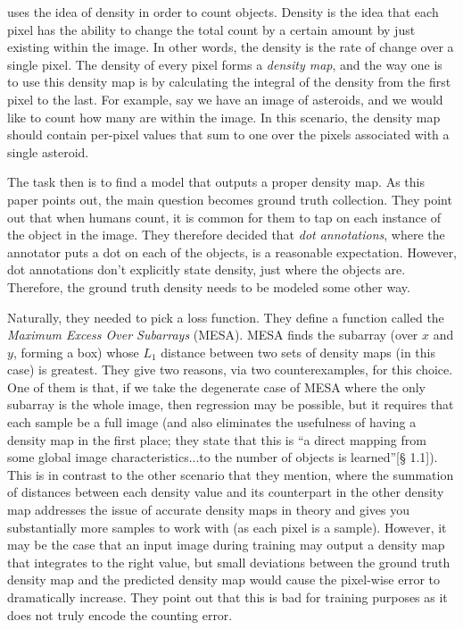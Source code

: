 \cite{learningtocount} uses the idea of density in order to count objects. Density is the idea that
each pixel has the ability to change the total count by a certain amount by just existing within the
image. In other words, the density is the rate of change over a single pixel. The density of every
pixel forms a \textit{density map}, and the way one is to use this density map is by calculating the
integral of the density from the first pixel to the last.
For example, say we have an image of asteroids, and we would like to count how many are within the
image. In this scenario, the density map should contain per-pixel values that sum to one over the
pixels associated with a single asteroid.

The task then is to find a model that outputs a proper density map. As this paper points out, the
main question becomes ground truth collection. They point out that when humans count, it is common
for them to tap on each instance of the object in the image. They therefore decided that \textit{dot
annotations}, where the annotator puts a dot on each of the objects, is a reasonable expectation.
However, dot annotations don't explicitly state density, just where the objects are. Therefore, the
ground truth density needs to be modeled some other way.

Naturally, they needed to pick a loss function. They define a function called the \textit{Maximum
Excess Over Subarrays} (MESA). MESA finds the subarray (over $x$ and $y$, forming a box) whose $L_1$
distance between two sets of density maps (in this case) is greatest. They give two reasons, via two
counterexamples, for this choice. One of them is that, if we take the degenerate case of MESA where
the only subarray is the whole image, then regression may be possible, but it requires that each
sample be a full image (and also eliminates the usefulness of having a density map in the first
place; they state that this is ``a direct mapping from some global image characteristics...to the
number of objects is learned''\cite{learningtocount}[§ 1.1]). This is in contrast to the other scenario that they
mention, where the summation of distances between each density value and its counterpart in the
other density map addresses the issue of accurate density maps in theory and gives you substantially
more samples to work with (as each pixel is a sample). However, it may be the case that an input
image during training may output a density map that integrates to the right value, but small
deviations between the ground truth density map and the predicted density map would cause the
pixel-wise error to dramatically increase. They point out that this is bad for training purposes as
it does not truly encode the counting error.


